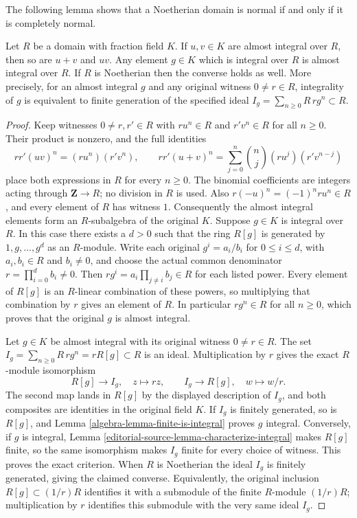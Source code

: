 \noindent
The following lemma shows that a Noetherian domain is normal
if and only if it is completely normal.

\begin{lemma}
\label{editorial-source-lemma-almost-integral}
Let $R$ be a domain with fraction field $K$.
If $u, v \in K$ are almost integral over $R$, then so are
$u + v$ and $uv$. Any element $g \in K$ which is integral over $R$
is almost integral over $R$. If $R$ is Noetherian
then the converse holds as well. More precisely, for an almost
integral $g$ and any original witness $0\ne r\in R$, integrality
of $g$ is equivalent to finite generation of the specified ideal
$I_g=\sum_{n\geq0}R\,rg^n\subset R$.
\end{lemma}

\begin{proof}
Keep witnesses $0\ne r,r'\in R$ with $ru^n\in R$ and
$r'v^n\in R$ for all $n\geq0$. Their product is nonzero, and
the full identities
$$
rr'(uv)^n=(ru^n)(r'v^n),\qquad
rr'(u+v)^n=\sum_{j=0}^n\binom nj(ru^j)(r'v^{n-j})
$$
place both expressions in $R$ for every $n\geq0$. The binomial
coefficients are integers acting through $\mathbf Z\to R$;
no division in $R$ is used. Also $r(-u)^n=(-1)^nru^n\in R$,
and every element of $R$ has witness $1$. Consequently the
almost integral elements form an $R$-subalgebra of the original $K$.
Suppose $g \in K$ is integral over $R$.
In this case there exists a $d > 0$ such that
the ring $R[g]$ is generated by $1, g, \ldots, g^d$ as an $R$-module.
Write each original $g^i=a_i/b_i$ for $0\leq i\leq d$,
with $a_i,b_i\in R$ and $b_i\ne0$, and choose the actual common
denominator $r=\prod_{i=0}^d b_i\ne0$. Then
$rg^i=a_i\prod_{j\ne i}b_j\in R$ for each listed power.
Every element of $R[g]$ is an $R$-linear combination of these
powers, so multiplying that combination by $r$ gives an element
of $R$. In particular $rg^n\in R$ for all $n\geq0$,
which proves that the original $g$ is almost integral.

\medskip\noindent
Let $g\in K$ be almost integral with its original witness
$0\ne r\in R$. The set
$I_g=\sum_{n\geq0}R\,rg^n=rR[g]\subset R$ is an ideal.
Multiplication by $r$ gives the exact $R$-module isomorphism
$$
R[g]\longrightarrow I_g,\quad z\longmapsto rz,
\qquad I_g\longrightarrow R[g],\quad w\longmapsto w/r.
$$
The second map lands in $R[g]$ by the displayed description of
$I_g$, and both composites are identities in the original field $K$.
If $I_g$ is finitely generated, so is $R[g]$, and Lemma
\ref{algebra-lemma-finite-is-integral} proves $g$ integral. Conversely,
if $g$ is integral, Lemma \ref{editorial-source-lemma-characterize-integral}
makes $R[g]$ finite, so the same isomorphism makes $I_g$ finite
for every choice of witness. This proves the exact criterion.
When $R$ is Noetherian the ideal $I_g$ is finitely generated,
giving the claimed converse. Equivalently, the original inclusion
$R[g]\subset(1/r)R$ identifies it with a submodule of the finite
$R$-module $(1/r)R$; multiplication by $r$ identifies this
submodule with the very same ideal $I_g$.
\end{proof}

